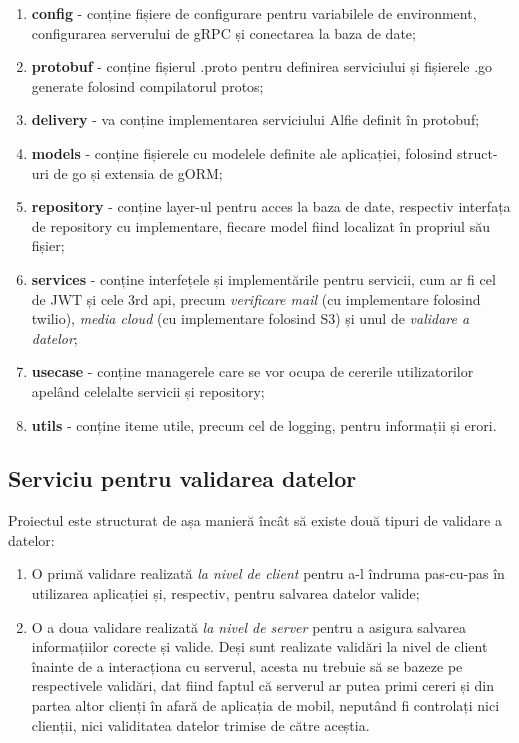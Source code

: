 \begin{enumerate}
    \item \textbf{config} -  conține fișiere de configurare pentru variabilele de environment, configurarea serverului de gRPC și conectarea la baza de date;
    \item \textbf{protobuf} - conține fișierul .proto pentru definirea serviciului și fișierele .go generate folosind compilatorul protos;
    \item \textbf{delivery} - va conține implementarea serviciului Alfie definit în protobuf;
    \item \textbf{models} - conține fișierele cu modelele definite ale aplicației, folosind struct-uri de go și extensia de gORM;
    \item \textbf{repository} - conține layer-ul pentru acces la baza de date, respectiv interfața de repository cu implementare, fiecare model fiind localizat în propriul său fișier;
    \item \textbf{services} - conține interfețele și implementările pentru servicii, cum ar fi cel de JWT și cele 3rd api, precum \textit{verificare mail} (cu implementare folosind twilio), \textit{media cloud} (cu implementare folosind S3) și unul de \textit{validare a datelor};
    \item \textbf{usecase} - conține managerele care se vor ocupa de cererile utilizatorilor apelând celelalte servicii și repository;
    \item \textbf{utils} - conține iteme utile, precum cel de logging, pentru informații și erori.
\end{enumerate}

\subsection{Serviciu pentru validarea datelor}

Proiectul este structurat de așa manieră încât să existe două tipuri de validare a datelor:
\begin{enumerate}
    \item O primă validare realizată \textit{la nivel de client} pentru a-l îndruma pas-cu-pas în utilizarea aplicației și, respectiv, pentru salvarea datelor valide;
    \item O a doua validare realizată \textit{la nivel de server} pentru a asigura salvarea informațiilor corecte și valide. Deși sunt realizate validări la nivel de client înainte de a interacționa cu serverul, acesta nu trebuie să se bazeze pe respectivele validări, dat fiind faptul că serverul ar putea primi cereri și din partea altor clienți în afară de aplicația de mobil, neputând fi controlați nici clienții, nici validitatea datelor trimise de către aceștia.
\end{enumerate}

